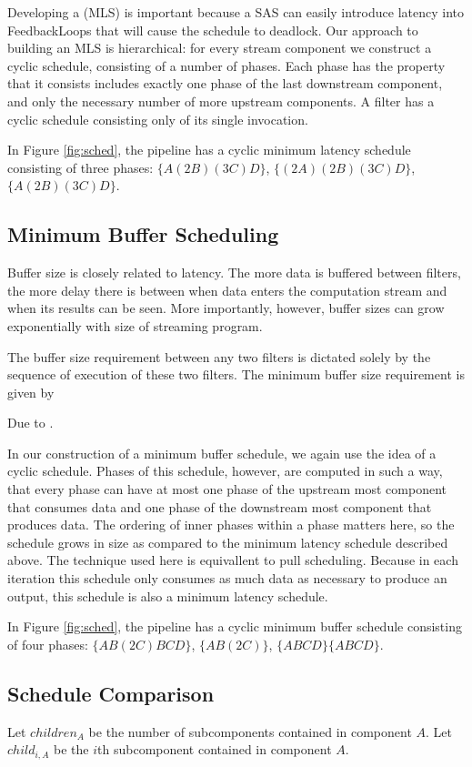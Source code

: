 Developing a (MLS) is important because a SAS can easily introduce latency 
into FeedbackLoops that will cause the schedule to deadlock.  Our approach 
to building an MLS is hierarchical: for every stream component we construct
a cyclic schedule, consisting of a number of phases.  Each phase has the
property that it consists includes exactly one phase of the last downstream
component, and only the necessary number of more upstream components.
A filter has a cyclic schedule consisting only of its single invocation.

In Figure \ref{fig:sched}, the pipeline has a cyclic minimum latency
schedule consisting of three
phases: $\{A(2B)(3C)D\}$, $\{(2A)(2B)(3C)D\}$, $\{A(2B)(3C)D\}$.

\subsection{Minimum Buffer Scheduling}

Buffer size is closely related to latency.  The more data is buffered between
filters, the more delay there is between when data enters the computation
stream and when its results can be seen.  More importantly, however, buffer
sizes can grow exponentially with size of streaming program.

The buffer size requirement between any two filters is dictated solely
by the sequence of execution of these two filters.  The minimum buffer
size requirement is given by 

Due to \cite{murthy94combined}.

In our construction of a minimum buffer schedule, we again use the idea
of a cyclic schedule.  Phases of this schedule, however, are computed in
such a way, that every phase can have at most one phase of the upstream
most component that consumes data and one phase of the downstream most 
component that produces data.  The ordering of inner phases within a phase
matters here, so the schedule grows in size as compared to the minimum latency
schedule described above.  The technique used here is equivallent to pull
scheduling.  Because in each iteration this schedule only consumes as much 
data as necessary to produce an output, this schedule is also a minimum 
latency schedule.  

In Figure \ref{fig:sched}, the pipeline has a cyclic minimum buffer schedule
consisting of four phases: $\{AB(2C)BCD\}$, $\{AB(2C)\}$, $\{ABCD\}\{ABCD\}$.

\subsection{Schedule Comparison}

Let $children_A$ be the number of subcomponents contained in component $A$.
Let $child_{i, A}$ be the $i$th subcomponent contained in component $A$.























